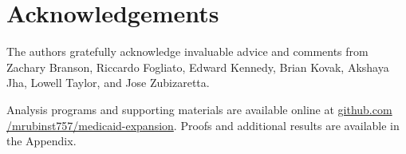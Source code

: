 \documentclass[aoas]{imsart}
\theoremstyle{plain}
\theoremstyle{remark}
\begin{document}
\section*{Acknowledgements}

The authors gratefully acknowledge invaluable advice and comments from Zachary Branson, Riccardo Fogliato, Edward Kennedy, Brian Kovak, Akshaya Jha, Lowell Taylor, and Jose Zubizaretta.

\begin{supplement}
Analysis programs and supporting materials are available online at \url{github.com /mrubinst757/medicaid-expansion}. Proofs and additional results are available in the Appendix.
\end{supplement}


\clearpage

\appendix



\clearpage



\clearpage



\clearpage



\clearpage



%



%
\end{document}

